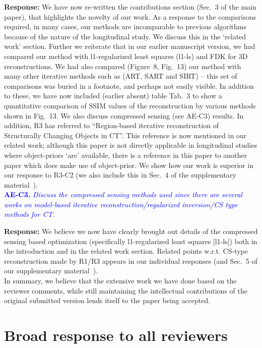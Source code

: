 \documentclass{article}
\begin{document}
\textbf{Response:} We have now re-written the contributions section (Sec.~3 of the main paper), that highlights the novelty of our work.  
As a response to the comparisons required,  in many cases, our methods are incomparable to previous algorithms because of the nature of the longitudinal study.  We discuss this in the `related work' section. Further we reiterate that in our earlier manuscript version, we had compared our method with l1-regularized least squares (l1-ls) and FDK for 3D reconstructions. We had also compared (Figure~8, Fig.~13) our method with many other iterative methods such as (ART, SART and SIRT) -- this set of comparisons was buried in a footnote, and perhaps not easily visible.
In addition to these, we have now included (earlier absent) table Tab.~3 to show a quantitative comparison of SSIM values of the reconstruction by various methods shown in Fig.~13.  We also discuss compressed sensing (see AE-C3) results.
In addition, 
R3 has referred to ``Region-based iterative reconstruction of Structurally Changing Objects in CT''. This reference is now mentioned in our related work; although this paper is not directly applicable in longitudinal studies where object-priors `are' available, there is a reference in this paper to another paper which does make use of object-prior. We show how our work is superior in our response to R3-C2 (we also include this in Sec.~4 of the supplementary material~\cite{supp_paper}). \\

\textcolor{blue}{\textbf{AE-C3.}\textit{ Discuss the compressed sensing methods used since there are several works on model-based iterative reconstruction/regularized inversion/CS type methods for CT.}}

\textbf{Response:} We believe we now have clearly brought out details of the compressed sensing based optimization (specifically l1-regularized least squares [l1-ls]) both in the introduction and in the related work section.  Related points w.r.t. CS-type reconstruction made by R1/R3 appears in our individual responses (and Sec.~5 of our supplementary material~\cite{supp_paper}).\\

In summary, we believe that the extensive work we have done based on the reviewer comments, while still maintaining the intellectual contributions of the original submitted version lends itself to the paper being accepted.

\section{Broad response to all reviewers}
\end{document}
